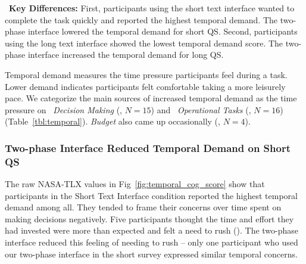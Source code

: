\begin{tldrbox}
   \faKey~\textbf{Key Differences:} %
    First, participants using the short text interface wanted to complete the task quickly and reported the highest temporal demand. The two-phase interface lowered the temporal demand for short QS. Second, participants using the long text interface showed the lowest temporal demand score. The two-phase interface increased the temporal demand for long QS.
\end{tldrbox}

Temporal demand measures the time pressure participants feel during a task. Lower demand indicates participants felt comfortable taking a more leisurely pace. We categorize the main sources of increased temporal demand as the time pressure on ~\textit{Decision Making} (, $N=15$) and ~\textit{Operational Tasks} (, $N=16$) (Table~\ref{tbl:temporal}). \textit{Budget} also came up occasionally (, $N=4$).

\subsubsection{Two-phase Interface Reduced Temporal Demand on Short QS} The raw NASA-TLX values in Fig~\ref{fig:temporal_cog_score} show that participants in the Short Text Interface condition reported the highest temporal demand among all. They tended to frame their concerns over time spent on making decisions negatively. Five participants thought the time and effort they had invested were more than expected and felt a need to rush (). The two-phase interface reduced this feeling of needing to rush -- only one participant who used our two-phase interface in the short survey expressed similar temporal concerns.

